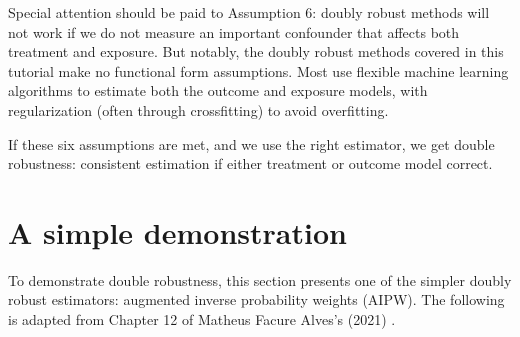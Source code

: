 \documentclass[letterpaper,10pt,english]{jupyterBook}
\begin{document}
\sphinxAtStartPar
Special attention should be paid to Assumption 6: doubly robust methods will not work if we do not measure an important confounder that affects both treatment and exposure. But notably, the doubly robust methods covered in this tutorial make no functional form assumptions. Most use flexible machine learning algorithms to estimate both the outcome and exposure models, with regularization (often through cross\sphinxhyphen{}fitting) to avoid overfitting.

\sphinxAtStartPar
If these six assumptions are met, and we use the right estimator, we get double robustness: consistent estimation if either treatment or outcome model correct.


\section{A simple demonstration}
\label{\detokenize{Introduction and Conceptual Overview:a-simple-demonstration}}
\sphinxAtStartPar
To demonstrate double robustness, this section presents one of the simpler doubly robust estimators: augmented inverse probability weights (AIPW). The following is adapted from Chapter 12 of Matheus Facure Alves’s (2021) .
\end{document}
